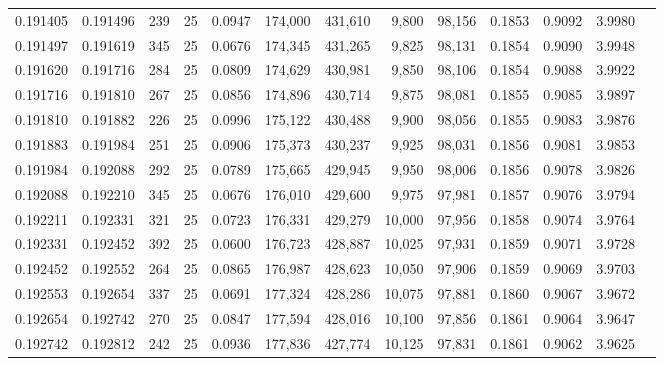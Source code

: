 \begin{tabular}{rrrrrrrrrrrrr}
0.191405 & 0.191496 &   239 &  25 &                                     0.0947 & 174,000 & 431,610 &   9,800 &  98,156 & 0.1853 & 0.9092 & 3.9980 \\
0.191497 & 0.191619 &   345 &  25 &                                     0.0676 & 174,345 & 431,265 &   9,825 &  98,131 & 0.1854 & 0.9090 & 3.9948 \\
0.191620 & 0.191716 &   284 &  25 &                                     0.0809 & 174,629 & 430,981 &   9,850 &  98,106 & 0.1854 & 0.9088 & 3.9922 \\
0.191716 & 0.191810 &   267 &  25 &                                     0.0856 & 174,896 & 430,714 &   9,875 &  98,081 & 0.1855 & 0.9085 & 3.9897 \\
0.191810 & 0.191882 &   226 &  25 &                                     0.0996 & 175,122 & 430,488 &   9,900 &  98,056 & 0.1855 & 0.9083 & 3.9876 \\
0.191883 & 0.191984 &   251 &  25 &                                     0.0906 & 175,373 & 430,237 &   9,925 &  98,031 & 0.1856 & 0.9081 & 3.9853 \\
0.191984 & 0.192088 &   292 &  25 &                                     0.0789 & 175,665 & 429,945 &   9,950 &  98,006 & 0.1856 & 0.9078 & 3.9826 \\
0.192088 & 0.192210 &   345 &  25 &                                     0.0676 & 176,010 & 429,600 &   9,975 &  97,981 & 0.1857 & 0.9076 & 3.9794 \\
0.192211 & 0.192331 &   321 &  25 &                                     0.0723 & 176,331 & 429,279 &  10,000 &  97,956 & 0.1858 & 0.9074 & 3.9764 \\
0.192331 & 0.192452 &   392 &  25 &                                     0.0600 & 176,723 & 428,887 &  10,025 &  97,931 & 0.1859 & 0.9071 & 3.9728 \\
0.192452 & 0.192552 &   264 &  25 &                                     0.0865 & 176,987 & 428,623 &  10,050 &  97,906 & 0.1859 & 0.9069 & 3.9703 \\
0.192553 & 0.192654 &   337 &  25 &                                     0.0691 & 177,324 & 428,286 &  10,075 &  97,881 & 0.1860 & 0.9067 & 3.9672 \\
0.192654 & 0.192742 &   270 &  25 &                                     0.0847 & 177,594 & 428,016 &  10,100 &  97,856 & 0.1861 & 0.9064 & 3.9647 \\
0.192742 & 0.192812 &   242 &  25 &                                     0.0936 & 177,836 & 427,774 &  10,125 &  97,831 & 0.1861 & 0.9062 & 3.9625 \\

\end{tabular}
